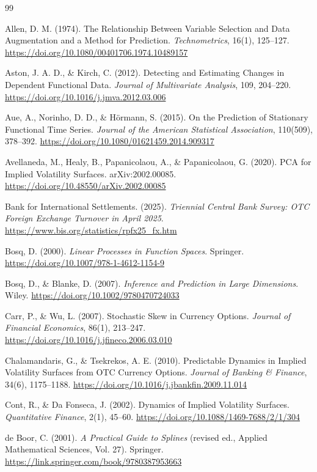 \documentclass[a4paper,11pt]{article}
\begin{document}
\begin{thebibliography}{99}
\small

Allen, D. M. (1974). The Relationship Between Variable Selection and Data Augmentation and a Method for Prediction. \emph{Technometrics}, 16(1), 125--127. \url{https://doi.org/10.1080/00401706.1974.10489157}

Aston, J. A. D., \& Kirch, C. (2012). Detecting and Estimating Changes in Dependent Functional Data. \emph{Journal of Multivariate Analysis}, 109, 204--220. \url{https://doi.org/10.1016/j.jmva.2012.03.006}

Aue, A., Norinho, D. D., \& Hörmann, S. (2015). On the Prediction of Stationary Functional Time Series. \emph{Journal of the American Statistical Association}, 110(509), 378--392. \url{https://doi.org/10.1080/01621459.2014.909317}

Avellaneda, M., Healy, B., Papanicolaou, A., \& Papanicolaou, G. (2020). PCA for Implied Volatility Surfaces. arXiv:2002.00085. \url{https://doi.org/10.48550/arXiv.2002.00085}

Bank for International Settlements. (2025). \emph{Triennial Central Bank Survey: OTC Foreign Exchange Turnover in April 2025}. \url{https://www.bis.org/statistics/rpfx25_fx.htm}

Bosq, D. (2000). \emph{Linear Processes in Function Spaces}. Springer. \url{https://doi.org/10.1007/978-1-4612-1154-9}

Bosq, D., \& Blanke, D. (2007). \emph{Inference and Prediction in Large Dimensions}. Wiley. \url{https://doi.org/10.1002/9780470724033}

Carr, P., \& Wu, L. (2007). Stochastic Skew in Currency Options. \emph{Journal of Financial Economics}, 86(1), 213--247. \url{https://doi.org/10.1016/j.jfineco.2006.03.010}

Chalamandaris, G., \& Tsekrekos, A. E. (2010). Predictable Dynamics in Implied Volatility Surfaces from OTC Currency Options. \emph{Journal of Banking \& Finance}, 34(6), 1175--1188. \url{https://doi.org/10.1016/j.jbankfin.2009.11.014}

Cont, R., \& Da Fonseca, J. (2002). Dynamics of Implied Volatility Surfaces. \emph{Quantitative Finance}, 2(1), 45--60. \url{https://doi.org/10.1088/1469-7688/2/1/304}

de Boor, C. (2001). \emph{A Practical Guide to Splines} (revised ed., Applied Mathematical Sciences, Vol. 27). Springer. \url{https://link.springer.com/book/9780387953663}


\end{thebibliography}
\end{document}
